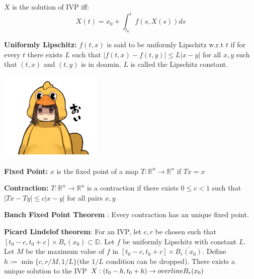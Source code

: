 \documentclass{tufte-book}
\begin{document}
\begin{tcolorbox}[colback=blue!8!white]
	$X$ is the solution of IVP iff:
	$$X(t)=x_0+\int_{t_0}^t f(s,X(s))ds$$
\end{tcolorbox}

\begin{tcolorbox}[colback=red!5!white]
	\textbf{Uniformly Lipschitz: }$f(t,x)$ is said to be uniformly Lipschitz w.r.t $t$ if for every $t$ there exists $L$ such that $|f(t,x)-f(t,y)|\leq L|x-y|$ for all $x,y$ such that $(t,x)$ and $(t,y)$ is in doamin. $L$ is called the Lipschitz constant.
\end{tcolorbox}


\begin{marginfigure}
	\includegraphics{2.png}
\end{marginfigure}

\begin{tcolorbox}[colback=red!5!white]
	\textbf{Fixed Point: }$x$ is the fixed point of a map $T:\mathbb R^n\to\mathbb R^n$ if $Tx=x$
\end{tcolorbox}

\begin{tcolorbox}[colback=red!5!white]
	\textbf{Contraction: }$T:\mathbb R^n\to\mathbb R^n$ is a contraction if there exists $0\leq c<1$ such that $|Tx-Ty|\leq c|x-y|$ for all pairs $x,y$
\end{tcolorbox}

\begin{tcolorbox}[colback=blue!8!white]
	\textbf{Banch Fixed Point Theorem }: Every contraction has an unique fixed point.
\end{tcolorbox}

\begin{tcolorbox}[colback=blue!8!white]
	\textbf{Picard Lindelof theorem}: For an IVP, let $c,r$ be chosen such that $[t_0-c,t_0+c]\times\overline{B_r(x_0)}\subset\mathbb D$. Let $f$ be uniformly Lipschitz with constant $L$. Let $M$ be the maximum value of $f$ in $[t_0-c,t_0+c]\times\overline{B_r(x_0)}$. Define $h:=\min\{c,r/M,1/L\}$(the $1/L$ condition can be dropped). There exists a unique solution to the IVP $X:(t_0-h,t_0+h)\to\\overline{B_r(x_0)}$
\end{tcolorbox}
\end{document}
